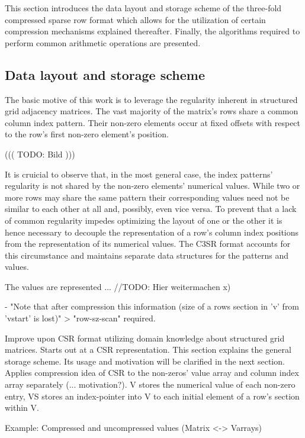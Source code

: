 \documentclass{article}
\begin{document}
  This section introduces the data layout and storage scheme of the three-fold compressed sparse row format which allows
  for the utilization of certain compression mechanisms explained thereafter. Finally, the algorithms required to
  perform common arithmetic operations are presented.

  \subsection{Data layout and storage scheme}

    The basic motive of this work is to leverage the regularity inherent in structured grid adjacency matrices. The vast
    majority of the matrix's rows share a common column index pattern. Their non-zero elements occur at fixed offsets
    with respect to the row's first non-zero element's position.

      ((( TODO: Bild )))

    It is cruicial to observe that, in the most general case, the index patterns' regularity is not shared by the
    non-zero elements' numerical values. While two or more rows may share the same pattern their corresponding values
    need not be similar to each other at all and, possibly, even vice versa. To prevent that a lack of common regularity
    impedes optimizing the layout of one or the other it is hence necessary to decouple the representation of a row's
    column index positions from the representation of its numerical values. The C3SR format accounts for this
    circumstance and maintains separate data structures for the patterns and values.

    The values are represented ... //TODO: Hier weitermachen x)



      - "Note that after compression this information (size of a rows section in 'v' from 'vstart' is lost)"
         > "row-sz-scan" required.

    Improve upon CSR format utilizing domain knowledge about structured grid matrices.
    Starts out at a CSR representation. This section explains the general storage scheme. Its usage and motivation will be clarified in the next section.
    Applies compression idea of CSR to the non-zeros' value array and column index array separately (... motivation?).
    V stores the numerical value of each non-zero entry, VS stores an index-pointer into V to each initial element of a row's section within V.

      Example: Compressed and uncompressed values (Matrix <-> Varrays)
\end{document}
